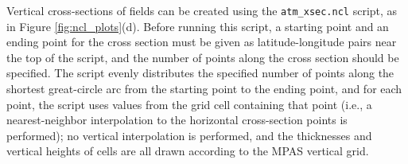 Vertical cross-sections of fields can be created using the {\tt atm\_xsec.ncl} script, as in Figure \ref{fig:ncl_plots}(d). Before running this script,
a starting point and an ending point for the cross section must be given as latitude-longitude pairs near the top of the script, and the number of points along
the cross section should be specified. The script evenly distributes the specified number of points along the shortest great-circle arc from the 
starting point to the ending point, and for each point, the script uses values from the grid cell containing that point (i.e., a nearest-neighbor interpolation
to the horizontal cross-section points is performed); no vertical interpolation is performed, and the thicknesses and vertical heights of cells are
all drawn according to the MPAS vertical grid.



